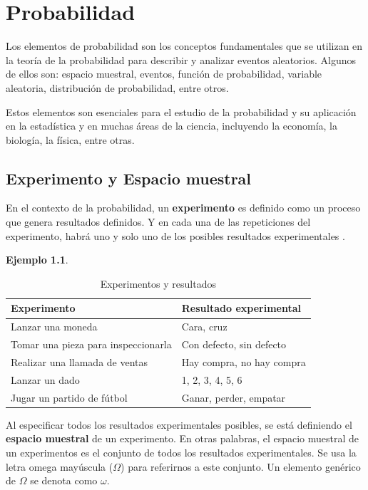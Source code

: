 \documentclass[
  11pt,
]{book}
\theoremstyle{definition}
\theoremstyle{definition}
\newtheorem{example}{Ejemplo}[chapter]
\theoremstyle{definition}
\theoremstyle{definition}
\theoremstyle{remark}
\begin{document}
\chapter{Probabilidad}\label{probabilidad-variables}

Los elementos de probabilidad son los conceptos fundamentales que se utilizan en la teoría de la probabilidad para describir y analizar eventos aleatorios. Algunos de ellos son: espacio muestral, eventos, función de probabilidad, variable aleatoria, distribución de probabilidad, entre otros.

Estos elementos son esenciales para el estudio de la probabilidad y su aplicación en la estadística y en muchas áreas de la ciencia, incluyendo la economía, la biología, la física, entre otras.

\section{Experimento y Espacio muestral}\label{probabilidad-variables-elementos-experimento}

En el contexto de la probabilidad, un \textbf{experimento} es definido como un proceso que genera resultados definidos. Y en cada una de las repeticiones del experimento, habrá uno y solo uno de los posibles resultados experimentales \citep[página 143]{anderson}.

\begin{example}
\leavevmode

\begin{table}[H]
\centering
\caption{\label{tab:experimentos}Experimentos y resultados}
\centering
\begin{tabular}[t]{ll}
\toprule
Experimento & Resultado experimental\\
\midrule
Lanzar una moneda & Cara, cruz\\
Tomar una pieza para inspeccionarla & Con defecto, sin defecto\\
Realizar una llamada de ventas & Hay compra, no hay compra\\
Lanzar un dado & 1, 2, 3, 4, 5, 6\\
Jugar un partido de fútbol & Ganar, perder, empatar\\
\bottomrule
\end{tabular}
\end{table}

\end{example}

Al especificar todos los resultados experimentales posibles, se está definiendo el \textbf{espacio muestral} de un experimento. En otras palabras, el espacio muestral de un experimentos es el conjunto de todos los resultados experimentales. Se usa la letra omega mayúscula (\(\Omega\)) para referirnos a este conjunto. Un elemento genérico de \(\Omega\) se denota como \(\omega\).
\end{document}
